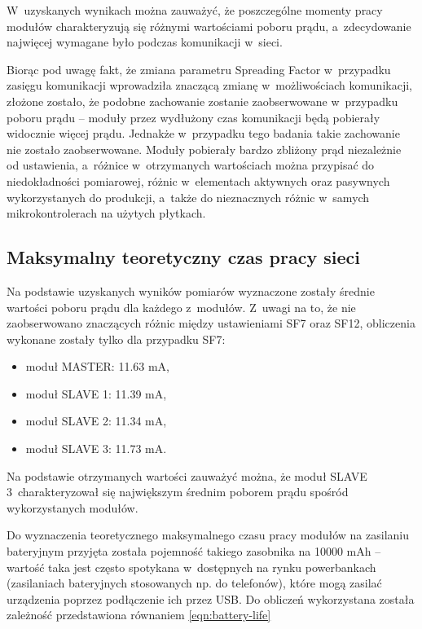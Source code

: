 


\FloatBarrier
W~uzyskanych wynikach można zauważyć, że poszczególne momenty pracy modułów charakteryzują się różnymi wartościami
poboru prądu, a~zdecydowanie najwięcej wymagane było podczas komunikacji w~sieci.

Biorąc pod uwagę fakt, że zmiana parametru Spreading Factor w~przypadku zasięgu komunikacji wprowadziła znaczącą zmianę
w~możliwościach komunikacji, złożone zostało, że podobne zachowanie zostanie zaobserwowane w~przypadku poboru prądu --
moduły przez wydłużony czas komunikacji będą pobierały widocznie więcej prądu. Jednakże w~przypadku tego badania takie
zachowanie nie zostało zaobserwowane. Moduły pobierały bardzo zbliżony prąd niezależnie od ustawienia, a~różnice
w~otrzymanych wartościach można przypisać do niedokładności pomiarowej, różnic w~elementach aktywnych oraz pasywnych
wykorzystanych do produkcji, a~także do nieznacznych różnic w~samych mikrokontrolerach na użytych płytkach.

\subsection{\label{sect:network-work-on-battery}Maksymalny teoretyczny czas pracy sieci} Na podstawie uzyskanych wyników
pomiarów wyznaczone zostały średnie wartości poboru prądu dla każdego z~modułów. Z~uwagi na to, że nie zaobserwowano
znaczących różnic między ustawieniami SF7 oraz SF12, obliczenia wykonane zostały tylko dla przypadku SF7:
\begin{itemize}[label=--]
    \item moduł MASTER: 11.63 mA,
    \item moduł SLAVE 1: 11.39 mA,
    \item moduł SLAVE 2: 11.34 mA,
    \item moduł SLAVE 3: 11.73 mA.
\end{itemize}
Na podstawie otrzymanych wartości zauważyć można, że moduł SLAVE 3~charakteryzował się największym średnim poborem prądu
spośród wykorzystanych modułów.

Do wyznaczenia teoretycznego maksymalnego czasu pracy modułów na zasilaniu bateryjnym przyjęta została pojemność takiego
zasobnika na 10000 mAh -- wartość taka jest często spotykana w~dostępnych na rynku powerbankach (zasilaniach
bateryjnych stosowanych np. do telefonów), które mogą zasilać urządzenia poprzez podłączenie ich przez USB. Do obliczeń
wykorzystana została zależność przedstawiona równaniem \ref{eqn:battery-life}

